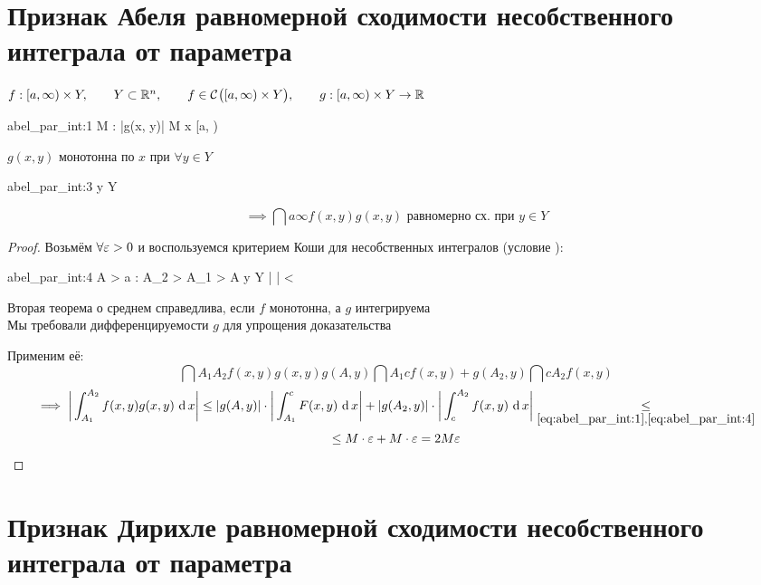 \section{Признак Абеля равномерной сходимости несобственного интеграла от параметра}

\begin{theorem}
	$ f : [a, \infty) \times Y, \qquad Y \subset \mathbb{R}^n, \qquad f \in \mathcal{C}^{} \big( {[a, \infty) \times Y} \big) , \qquad g : [a, \infty) \times Y \to \mathbb{R} $
	\begin{equ}{abel_par_int:1}
		\exist M : \quad |g(x, y)| \le M \quad \forall x \in [a, \infty)
	\end{equ}
	$ g(x, y) $ монотонна по $ x $ при $ \forall y \in Y $
	\begin{equ}{abel_par_int:3}
		  y \in Y
	\end{equ}
	$$ \implies \dint{a}\infty{f(x, y)g(x, y)} \text{ равномерно сх. при } y \in Y $$
\end{theorem}

\begin{proof}
	Возьмём $ \forall \varepsilon > 0 $ и воспользуемся критерием Коши для несобственных интегралов (условие ):
	\begin{equ}{abel_par_int:4}
		\exist A > a : \quad \forall A_2 > A_1 > A \quad \forall y \in Y \quad \bigg|  \bigg| < \veps
	\end{equ}
	\begin{statement}
		Вторая теорема о среднем справедлива, если $ f $ монотонна, а $ g $ интегрируема \\
		Мы требовали дифференцируемости $ g $ для упрощения доказательства
	\end{statement}
	Применим её:
	$$ \dint{A_1}{A_2}{f(x, y)g(x, y)} g(A, y) \dint{A_1}c{f(x, y)} + g(A_2, y)\dint{c}{A_2}{f(x, y)} $$
	\begin{multline*}
		\implies \bigg| \dint{A_1}{A_2}{f(x, y)g(x, y)} \bigg| \le |g(A, y)| \cdot \bigg| \dint{A_1}c{F(x, y)} \bigg| + |g(A_2, y)| \cdot \bigg| \dint{c}{A_2}{f(x, y)}\bigg| \underset{\eref{abel_par_int:1}, \eref{abel_par_int:4}}\le \\
		\le M \cdot \veps + M \cdot \veps = 2M\veps
	\end{multline*}
\end{proof}

\section{Признак Дирихле равномерной сходимости несобственного интеграла от параметра}

